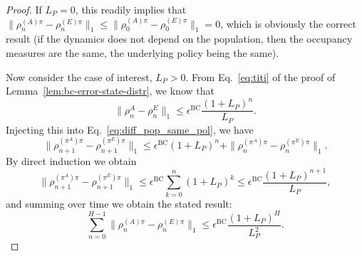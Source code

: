 \documentclass{article}
\begin{document}
\begin{proof}
If $L_P=0$, this readily implies that $\|\rho_{n}^{(A)\pi} - \rho_{n}^{(E)\pi}\|_1\leq \|\rho_{0}^{(A)\pi} - \rho_{0}^{(E)\pi}\|_1=0$, which is obviously the correct result (if the dynamics does not depend on the population, then the occupancy measures are the same, the underlying policy being the same). 

Now consider the case of interest, $L_P>0$. From Eq.~\eqref{eq:titi} of the proof of Lemma~\ref{lem:bc-error-state-distr}, we know that 
\begin{equation}
    \|\rho^{A}_n - \rho^E_n\|_1 \leq \epsilon^\mathrm{BC} \frac{(1+L_P)^n}{L_P}.
\end{equation}
Injecting this into Eq.~\eqref{eq:diff_pop_same_pol}, we have 
\begin{equation}
    \|\rho_{n+1}^{(\pi^A)\pi} - \rho_{n+1}^{(\pi^E)\pi}\|_1 \leq \epsilon^\mathrm{BC} (1+L_P)^n + \|\rho_{n}^{(\pi^A)\pi} - \rho_{n}^{(\pi^E)\pi}\|_1. 
\end{equation}
By direct induction we obtain
\begin{equation}
    \|\rho_{n+1}^{(\pi^A)\pi} - \rho_{n+1}^{(\pi^E)\pi}\|_1 \leq \epsilon^\mathrm{BC} \sum_{k=0}^n (1+L_P)^k \leq \epsilon^\mathrm{BC} \frac{(1+L_P)^{n+1}}{L_P},
\end{equation}
and summing over time we obtain the stated result:
\begin{equation}
    \sum_{n=0}^{H-1} \|\rho_{n}^{(A)\pi} - \rho_{n}^{(E)\pi}\|_1 \leq \epsilon^\mathrm{BC} \frac{(1+L_P)^{H}}{L_P^2}.
\end{equation}
\end{proof}
\end{document}
